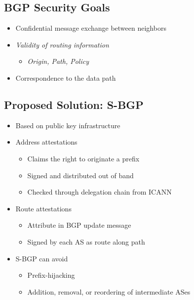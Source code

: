 \subsection{BGP Security Goals}
\begin{itemize}[nosep]
    \item Confidential message exchange between neighbors
    \item \emph{Validity of routing information}
          \begin{itemize}[nosep]
              \item \emph{Origin, Path, Policy}
          \end{itemize}
    \item Correspondence to the data path
\end{itemize}

\subsection{Proposed Solution: S-BGP}
\begin{itemize}[nosep]
    \item Based on public key infrastructure
    \item Address attestations
          \begin{itemize}[nosep]
              \item Claims the right to originate a prefix
              \item Signed and distributed out of band
              \item Checked through delegation chain from ICANN
          \end{itemize}
    \item Route attestations
          \begin{itemize}[nosep]
              \item Attribute in BGP update message
              \item Signed by each AS as route along path
          \end{itemize}
    \item S-BGP can avoid
          \begin{itemize}[nosep]
              \item Prefix-hijacking
              \item Addition, removal, or reordering of intermediate ASes
          \end{itemize}
\end{itemize}

